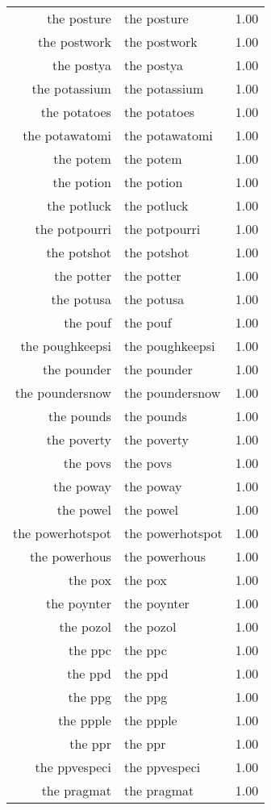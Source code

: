 \begin{table}[ht]
\begin{tabular}{rlr}
  the posture & the posture & 1.00 \\ 
  the postwork & the postwork & 1.00 \\ 
  the postya & the postya & 1.00 \\ 
  the potassium & the potassium & 1.00 \\ 
  the potatoes & the potatoes & 1.00 \\ 
  the potawatomi & the potawatomi & 1.00 \\ 
  the potem & the potem & 1.00 \\ 
  the potion & the potion & 1.00 \\ 
  the potluck & the potluck & 1.00 \\ 
  the potpourri & the potpourri & 1.00 \\ 
  the potshot & the potshot & 1.00 \\ 
  the potter & the potter & 1.00 \\ 
  the potusa & the potusa & 1.00 \\ 
  the pouf & the pouf & 1.00 \\ 
  the poughkeepsi & the poughkeepsi & 1.00 \\ 
  the pounder & the pounder & 1.00 \\ 
  the poundersnow & the poundersnow & 1.00 \\ 
  the pounds & the pounds & 1.00 \\ 
  the poverty & the poverty & 1.00 \\ 
  the povs & the povs & 1.00 \\ 
  the poway & the poway & 1.00 \\ 
  the powel & the powel & 1.00 \\ 
  the powerhotspot & the powerhotspot & 1.00 \\ 
  the powerhous & the powerhous & 1.00 \\ 
  the pox & the pox & 1.00 \\ 
  the poynter & the poynter & 1.00 \\ 
  the pozol & the pozol & 1.00 \\ 
  the ppc & the ppc & 1.00 \\ 
  the ppd & the ppd & 1.00 \\ 
  the ppg & the ppg & 1.00 \\ 
  the ppple & the ppple & 1.00 \\ 
  the ppr & the ppr & 1.00 \\ 
  the ppvespeci & the ppvespeci & 1.00 \\ 
  the pragmat & the pragmat & 1.00 \\ 

\end{tabular}
\end{table}
